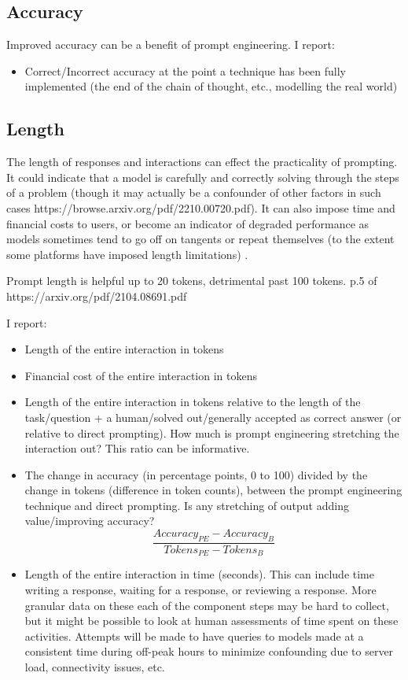 \documentclass[11pt]{article}
\begin{document}
\subsection*{Accuracy}

Improved accuracy can be a benefit of prompt engineering. I report:

\begin{itemize}
  \item Correct/Incorrect accuracy at the point a technique has been fully implemented (the end of the chain of thought, etc., modelling the real world)
\end{itemize}

\subsection*{Length}

The length of responses and interactions can effect the practicality of prompting. It could indicate that a model is carefully and correctly solving through the steps of a problem (though it may actually be a confounder of other factors in such cases https://browse.arxiv.org/pdf/2210.00720.pdf). It can also impose time and financial costs to users, or become an indicator of degraded performance as models sometimes tend to go off on tangents or repeat themselves (to the extent some platforms have imposed length limitations) \cite{mann_microsoft_nodate}. 

Prompt length is helpful up to 20 tokens, detrimental past 100 tokens. p.5 of https://arxiv.org/pdf/2104.08691.pdf

I report:

\begin{itemize}
  \item Length of the entire interaction in tokens
  \item Financial cost of the entire interaction in tokens
  \item Length of the entire interaction in tokens relative to the length of the task/question + a human/solved out/generally accepted as correct answer (or relative to direct prompting). How much is prompt engineering stretching the interaction out? This ratio can be informative.
  \item The change in accuracy (in percentage points, 0 to 100) divided by the change in tokens (difference in token counts), between the prompt engineering technique and direct prompting. Is any stretching of output adding value/improving accuracy? %
  \begin{displaymath}
    \frac{Accuracy_{PE} - Accuracy_{B}}{Tokens_{PE} - Tokens_{B}}
  \end{displaymath}
  \item Length of the entire interaction in time (seconds). This can include time writing a response, waiting for a response, or reviewing a response. More granular data on these each of the component steps may be hard to collect, but it might be possible to look at human assessments of time spent on these activities. Attempts will be made to have queries to models made at a consistent time during off-peak hours to minimize confounding due to server load, connectivity issues, etc.
\end{itemize}
\end{document}
